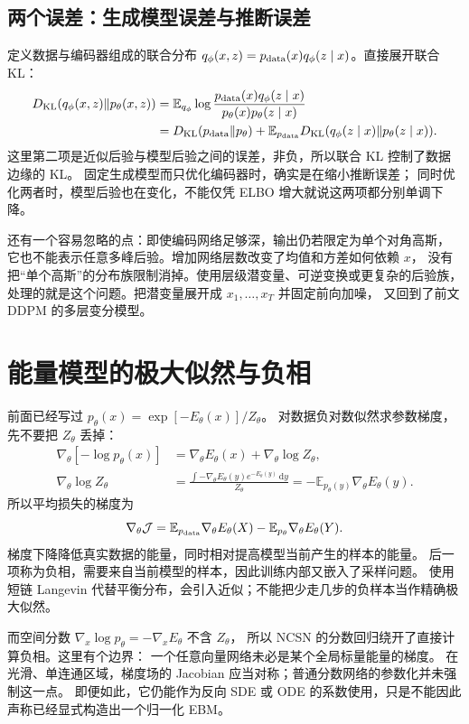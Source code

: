 \subsection{两个误差：生成模型误差与推断误差}
定义数据与编码器组成的联合分布
$q_\phi(x,z)=p_{\rm data}(x)q_\phi(z\mid x)$。直接展开联合 KL：
\begin{align}
D_{\rm KL}(q_\phi(x,z)\|p_\theta(x,z))
 &=\mathbb E_{q_\phi}\log
 \frac{p_{\rm data}(x)q_\phi(z\mid x)}{p_\theta(x)p_\theta(z\mid x)}\\
 &=D_{\rm KL}(p_{\rm data}\|p_\theta)
 +\mathbb E_{p_{\rm data}}D_{\rm KL}(q_\phi(z\mid x)\|p_\theta(z\mid x)).
\end{align}
这里第二项是近似后验与模型后验之间的误差，非负，所以联合 KL 控制了数据边缘的 KL。
固定生成模型而只优化编码器时，确实是在缩小推断误差；
同时优化两者时，模型后验也在变化，不能仅凭 ELBO 增大就说这两项都分别单调下降。

还有一个容易忽略的点：即使编码网络足够深，输出仍若限定为单个对角高斯，
它也不能表示任意多峰后验。增加网络层数改变了均值和方差如何依赖 $x$，
没有把“单个高斯”的分布族限制消掉。使用层级潜变量、可逆变换或更复杂的后验族，
处理的就是这个问题。把潜变量展开成 $x_1,\ldots,x_T$ 并固定前向加噪，
又回到了前文 DDPM 的多层变分模型。

\section{能量模型的极大似然与负相}
前面已经写过 $p_\theta(x)=\exp[-E_\theta(x)]/Z_\theta$。
对数据负对数似然求参数梯度，先不要把 $Z_\theta$ 丢掉：
\begin{align}
\nabla_\theta[-\log p_\theta(x)]
 &=\nabla_\theta E_\theta(x)+\nabla_\theta\log Z_\theta,\\
\nabla_\theta\log Z_\theta
 &=\frac{\int-\nabla_\theta E_\theta(y)e^{-E_\theta(y)}\,\mathrm dy}{Z_\theta}
 =-\mathbb E_{p_\theta(y)}\nabla_\theta E_\theta(y).
\end{align}
所以平均损失的梯度为
\[
\nabla_\theta\mathcal J
=\mathbb E_{p_{\rm data}}\nabla_\theta E_\theta(X)
 -\mathbb E_{p_\theta}\nabla_\theta E_\theta(Y).
\label{supp:ebm-gradient}
\]
梯度下降降低真实数据的能量，同时相对提高模型当前产生的样本的能量。
后一项称为负相，需要来自当前模型的样本，因此训练内部又嵌入了采样问题。
使用短链 Langevin 代替平衡分布，会引入近似；不能把少走几步的负样本当作精确极大似然。

而空间分数 $\nabla_x\log p_\theta=-\nabla_xE_\theta$ 不含 $Z_\theta$，
所以 NCSN 的分数回归绕开了直接计算负相。这里有个边界：
一个任意向量网络未必是某个全局标量能量的梯度。
在光滑、单连通区域，梯度场的 Jacobian 应当对称；普通分数网络的参数化并未强制这一点。
即便如此，它仍能作为反向 SDE 或 ODE 的系数使用，只是不能因此声称已经显式构造出一个归一化 EBM。

